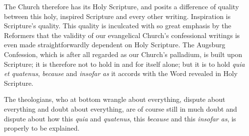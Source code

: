 \documentclass[12pt,a4paper]{book}
\begin{document}
The Church therefore has its Holy Scripture, and posits a difference of quality
between this holy, inspired Scripture and every other
writing. Inspiration is Scripture's quality. This quality is inculcated with so
great emphasis by the Reformers that the validity
of our evangelical Church's confessional writings is even made straightforwardly
dependent on Holy Scripture. The Augsburg Confession, which is after all regarded
as our Church's palladium, is built upon Scripture; it is therefore not to hold
in and for itself alone; but it is to hold \textit{quia et quatenus},
\emph{because} and \emph{insofar as} it accords with the Word revealed in Holy
Scripture.

The theologians, who at bottom wrangle about everything, dispute about everything
and doubt about everything, are of course still in much doubt and dispute about
how this \textit{quia} and \textit{quatenus}, this \emph{because} and this
\emph{insofar as}, is properly to be explained.
\end{document}
